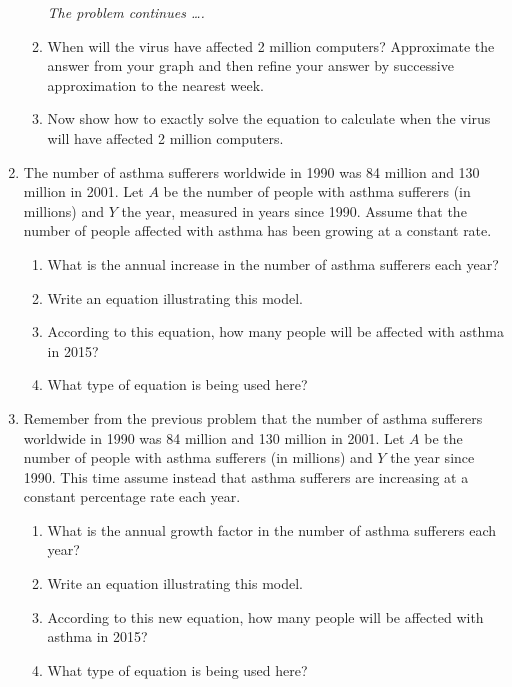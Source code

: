 \documentclass[12pt]{article}
\begin{document}
\begin{enumerate}
\begin{enumerate}
\newpage
\hspace{-.5 in}\emph{The problem continues \ldots.}

\item When will the virus have affected 2 million computers?  Approximate the answer from your graph and then refine your answer by successive approximation to the nearest week.
\vfill
\item Now show how to exactly solve the equation to calculate when the virus will have affected 2 million computers.
\vfill
\end{enumerate}




\newpage


\item The number of asthma sufferers worldwide in 1990 was 84 million and 130 million in 2001.  Let $A$ be the number of people with asthma sufferers (in millions) and $Y$ the year, measured in years since 1990.  Assume that the number of people affected with asthma has been growing at a constant rate.

\begin{enumerate}
\item What is the annual increase in the number of asthma sufferers each year?
\vfill
\item Write an equation illustrating this model.
\vfill
\item According to this equation, how many people will be affected with asthma in 2015?
\vfill
\item What type of equation is being used here?
\vfill
\end{enumerate}

\newpage

\item  Remember from the previous problem that the number of asthma sufferers worldwide in 1990 was 84 million and 130 million in 2001.  Let $A$ be the number of people with asthma sufferers (in millions) and $Y$ the year since 1990.  This time assume instead that asthma sufferers are increasing at a constant percentage rate each year.

\begin{enumerate}
\item What is the annual growth factor in the number of asthma sufferers each year?
\vfill
\item Write an equation illustrating this model.
\vfill
\item According to this new equation, how many people will be affected with asthma in 2015?
\vfill
\item What type of equation is being used here?
\vfill
\end{enumerate}






\end{enumerate}
\end{document}
